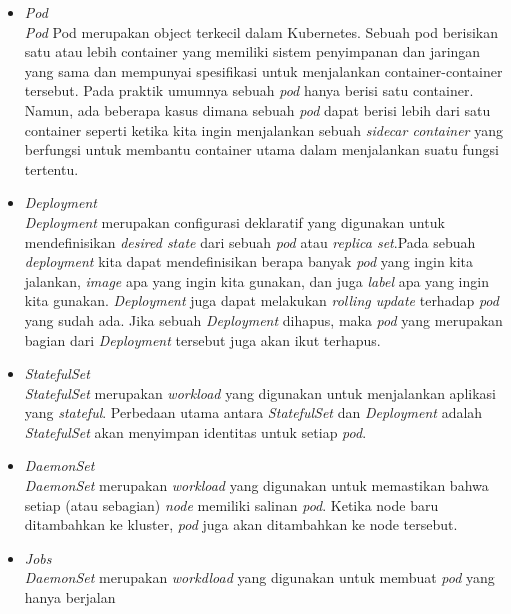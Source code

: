 \begin{itemize}
    \item \textit{Pod} \\
          \textit{Pod} Pod merupakan object terkecil dalam Kubernetes.
          Sebuah pod berisikan satu atau lebih container yang memiliki sistem penyimpanan
          dan jaringan yang sama dan mempunyai spesifikasi untuk menjalankan container-container tersebut.
          Pada praktik umumnya sebuah \textit{pod} hanya berisi satu container. Namun, ada beberapa kasus
          dimana sebuah \textit{pod} dapat berisi lebih dari satu container seperti ketika kita ingin menjalankan
          sebuah \textit{sidecar container} yang berfungsi untuk membantu container utama dalam menjalankan
          suatu fungsi tertentu.
    \item \textit{Deployment} \\
          \textit{Deployment} merupakan configurasi deklaratif yang digunakan untuk mendefinisikan
          \textit{desired state} dari sebuah \textit{pod} atau \textit{replica set}.Pada sebuah \textit{deployment}
          kita dapat mendefinisikan berapa banyak \textit{pod} yang ingin kita jalankan, \textit{image} apa yang
          ingin kita gunakan, dan juga \textit{label} apa yang ingin kita gunakan. \textit{Deployment} juga
          dapat melakukan \textit{rolling update} terhadap \textit{pod} yang sudah ada.
          Jika sebuah \textit{Deployment} dihapus, maka \textit{pod} yang merupakan bagian dari \textit{Deployment} tersebut
          juga akan ikut terhapus.
    \item \textit{StatefulSet} \\
          \textit{StatefulSet} merupakan \textit{workload} yang digunakan untuk menjalankan aplikasi yang \textit{stateful}.
          Perbedaan utama antara \textit{StatefulSet} dan \textit{Deployment} adalah \textit{StatefulSet} akan menyimpan
          identitas untuk setiap \textit{pod}.
    \item \textit{DaemonSet} \\
          \textit{DaemonSet} merupakan \textit{workload} yang digunakan untuk memastikan bahwa setiap (atau sebagian) \textit{node}
          memiliki salinan \textit{pod}. Ketika node baru ditambahkan ke kluster, \textit{pod} juga akan ditambahkan ke node tersebut.
    \item \textit{Jobs} \\
          \textit{DaemonSet} merupakan \textit{workdload} yang digunakan untuk membuat \textit{pod} yang hanya berjalan

\end{itemize}
